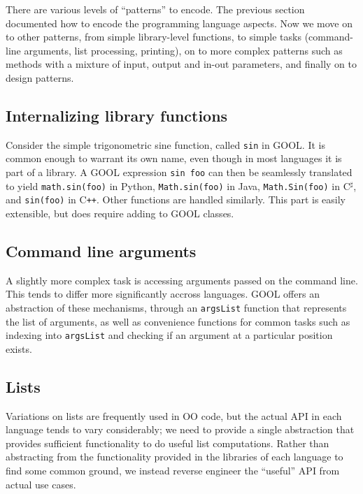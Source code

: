 \documentclass[sigplan,review,anonymous,prologue,dvipsnames]{acmart}
\newcommand{\Csharp}{C$^{\sharp}$}
\newcommand{\Cplusplus}{C\texttt{++}}
\begin{document}
There are various levels of ``patterns'' to encode. The previous section
documented how to encode the programming language aspects. Now we
move on to other patterns, from simple library-level functions, to
simple tasks (command-line arguments, list processing, printing), on to
more complex patterns such as methods with a mixture of input, output
and in-out parameters, and finally on to design patterns.

\subsection{Internalizing library functions}

Consider the simple trigonometric sine function, called \verb|sin| in
GOOL. It is common enough to warrant its own name, even though in most
languages it is part of a library.  A GOOL expression \verb|sin foo|
can then be seamlessly translated to 
yield \verb|math.sin(foo)| in Python, \verb|Math.sin(foo)| in Java,
\verb|Math.Sin(foo)| in \Csharp, and \verb|sin(foo)| in \Cplusplus. Other
functions are handled similarly.  This part is easily extensible, but does
require adding to GOOL classes.

\subsection{Command line arguments}

A slightly more complex task is accessing arguments passed on the command
line. This tends to differ more significantly accross languages. GOOL
offers an abstraction of these mechanisms, through an \verb|argsList| function
that represents the list of arguments, as well as convenience functions for
common tasks such as indexing into \verb|argsList| and checking if an argument
at a particular position exists.  

\subsection{Lists}

Variations on lists are frequently used in OO code, but the actual API
in each language tends to vary considerably; we need to provide a single
abstraction that provides sufficient functionality to do useful list
computations.  Rather than abstracting from the functionality provided
in the libraries of each language to find some common ground, we instead
reverse engineer the ``useful'' API from actual use cases.  
\end{document}

